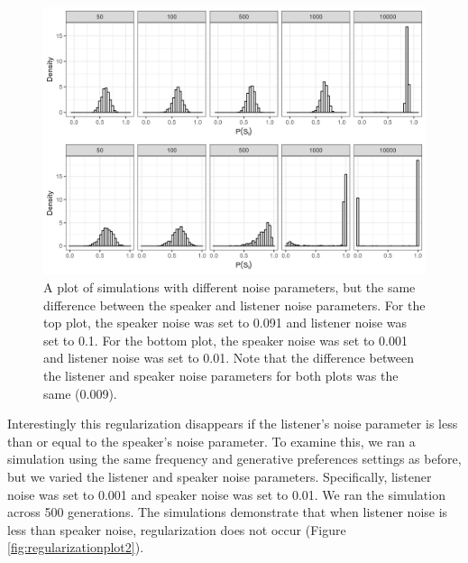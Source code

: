 \documentclass[10pt, letterpaper]{article}
\newenvironment{CodeChunk}{}{}
\begin{document}
\begin{CodeChunk}
\begin{figure}[tb]

{\centering \includegraphics[width=1\linewidth]{Figures/absolute_matters} 

}

\caption[A plot of simulations with different noise parameters, but the same difference between the speaker and listener noise parameters]{A plot of simulations with different noise parameters, but the same difference between the speaker and listener noise parameters. For the top plot, the speaker noise was set to 0.091 and listener noise was set to 0.1. For the bottom plot, the speaker noise was set to 0.001 and listener noise was set to 0.01. Note that the difference between the listener and speaker noise parameters for both plots was the same (0.009).}\label{fig:absolutediff}
\end{figure}
\end{CodeChunk}

Interestingly this regularization disappears if the listener's noise
parameter is less than or equal to the speaker's noise parameter. To
examine this, we ran a simulation using the same frequency and
generative preferences settings as before, but we varied the listener
and speaker noise parameters. Specifically, listener noise was set to
0.001 and speaker noise was set to 0.01. We ran the simulation across
500 generations. The simulations demonstrate that when listener noise is
less than speaker noise, regularization does not occur (Figure
\ref{fig:regularizationplot2}).
\end{document}
